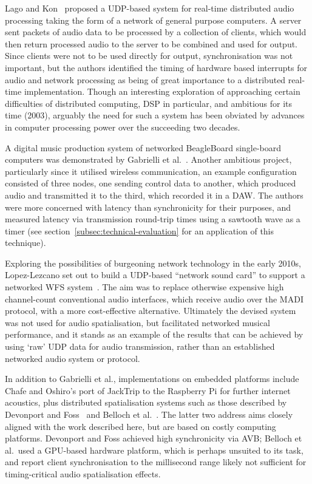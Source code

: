 \documentclass[utf8]{FrontiersinHarvard}
\newcommand{\secref}[1]{section~\ref{#1}}
\begin{document}
    Lago and Kon~\citep{lago_middleware_2003} proposed a UDP-based system for
    real-time distributed audio processing taking the form of a network of general
    purpose computers.
    A server sent packets of audio data to be processed by a collection of
    clients, which would then return processed audio to the server to be combined
    and used for output.
    Since clients were not to be used directly for output, synchronisation was not
    important, but the authors identified the timing of hardware based interrupts
    for audio and network processing as being of great importance to a distributed
    real-time implementation.
    Though an interesting exploration of approaching certain difficulties of
    distributed computing, DSP in particular, and ambitious for its time (2003),
    arguably the need for such a system has been obviated by advances in computer
    processing power over the succeeding two decades.

    A digital music production system of networked BeagleBoard single-board
    computers was demonstrated by Gabrielli et al.~\citep{gabrielli_networked_2012}.
    Another ambitious project, particularly since it utilised wireless
    communication, an example configuration consisted of three nodes, one sending
    control data to another, which produced audio and transmitted it to the third,
    which recorded it in a DAW.
    The authors were more concerned with latency than synchronicity for their
    purposes, and measured latency via transmission round-trip times using a
    sawtooth wave as a timer (see \secref{subsec:technical-evaluation} for an
    application of this technique).

    Exploring the possibilities of burgeoning network technology in the early 2010s,
    Lopez-Lezcano set out to build a UDP-based ``network sound card'' to support
    a networked WFS system~\citep{lopez-lezcano_jack_2012}.
    The aim was to replace otherwise expensive high channel-count conventional
    audio interfaces, which receive audio over the MADI protocol, with a more
    cost-effective alternative.
    Ultimately the devised system was not used for audio spatialisation, but
    facilitated networked musical performance, and it stands as an example of the
    results that can be achieved by using `raw' UDP data for audio transmission,
    rather than an established networked audio system or protocol.

    In addition to Gabrielli et al., implementations on embedded platforms include
    Chafe and Oshiro's port of JackTrip to the Raspberry Pi for further internet
    acoustics, plus distributed spatialisation systems such as those described by
    Devonport and Foss~\citep{devonport_distribution_2019} and Belloch et
    al.~\citep{belloch_performance_2021}.
    The latter two address aims closely aligned with the work described here, but
    are based on costly computing platforms.
    Devonport and Foss achieved high synchronicity via AVB; Belloch et al.\ used a
    GPU-based hardware platform, which is perhaps unsuited to its task, and report
    client synchronisation to the millisecond range \textemdash{} likely not
    sufficient for timing-critical audio spatialisation effects.
\end{document}
